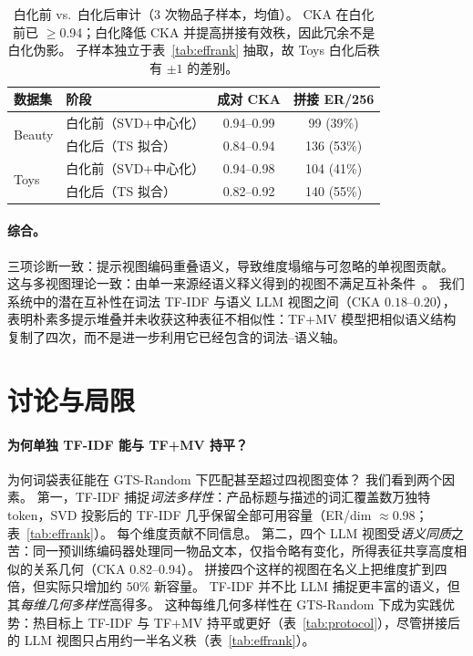 \documentclass[sigconf,natbib=true,anonymous]{acmart}
\newcommand{\tfidf}{\textsc{TF-IDF}\xspace}
\newcommand{\llm}{\textsc{LLM}\xspace}
\newcommand{\tfmv}{\textsc{TF+MV}\xspace}
\begin{document}
\begin{table}[t]
\centering
\caption{%
白化前 vs.\ 白化后审计（3 次物品子样本，均值）。
CKA 在白化前已 $\ge$0.94；白化降低 CKA 并提高拼接有效秩，因此冗余不是白化伪影。
子样本独立于表~\ref{tab:effrank} 抽取，故 Toys 白化后秩有 $\pm 1$ 的差别。%
}
\label{tab:cka-prepost}
\small
\begin{tabular}{@{}llcc@{}}
\toprule
数据集 & 阶段 & 成对 CKA & 拼接 ER/256 \\
\midrule
\multirow{2}{*}{Beauty}
 & 白化前（SVD+中心化）  & 0.94--0.99 & 99 (39\%) \\
 & 白化后（TS 拟合）     & 0.84--0.94 & 136 (53\%) \\
\midrule
\multirow{2}{*}{Toys}
 & 白化前（SVD+中心化）  & 0.94--0.98 & 104 (41\%) \\
 & 白化后（TS 拟合）     & 0.82--0.92 & 140 (55\%) \\
\bottomrule
\end{tabular}
\end{table}

\paragraph{综合。}
三项诊断一致：提示视图编码重叠语义，导致维度塌缩与可忽略的单视图贡献。
这与多视图理论一致：由单一来源经语义释义得到的视图不满足互补条件~\cite{xu2013multiview}。
我们系统中的潜在互补性在词法 \tfidf 与语义 \llm 视图之间（CKA $0.18$--$0.20$），表明朴素多提示堆叠并未收获这种表征不相似性：\tfmv 模型把相似语义结构复制了四次，而不是进一步利用它已经包含的词法--语义轴。

\section{讨论与局限}
\label{sec:discussion}

\paragraph{为何单独 TF-IDF 能与 \tfmv 持平？}
为何词袋表征能在 GTS-Random 下匹配甚至超过四视图变体？
我们看到两个因素。
第一，\tfidf 捕捉\emph{词法多样性}：产品标题与描述的词汇覆盖数万独特 token，SVD 投影后的 TF-IDF 几乎保留全部可用容量（ER/dim $\approx$0.98；表~\ref{tab:effrank}）。
每个维度贡献不同信息。
第二，四个 LLM 视图受\emph{语义同质}之苦：同一预训练编码器处理同一物品文本，仅指令略有变化，所得表征共享高度相似的关系几何（CKA 0.82--0.94）。
拼接四个这样的视图在名义上把维度扩到四倍，但实际只增加约 $50\%$ 新容量。
TF-IDF 并不比 LLM 捕捉更丰富的语义，但其\emph{每维几何多样性}高得多。
这种每维几何多样性在 GTS-Random 下成为实践优势：热目标上 \tfidf 与 \tfmv 持平或更好（表~\ref{tab:protocol}），尽管拼接后的 LLM 视图只占用约一半名义秩（表~\ref{tab:effrank}）。
\end{document}
